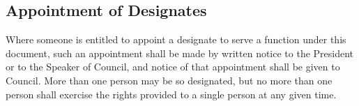 \subsection{Appointment of Designates}

Where someone is entitled to appoint a designate to serve a function
under this document, such an appointment shall be made by written notice to
the President or to the Speaker of Council, and notice of that appointment
shall be given to Council. More than one person may be so designated, but no
more than one person shall exercise the rights provided to a single person at
any given time.
